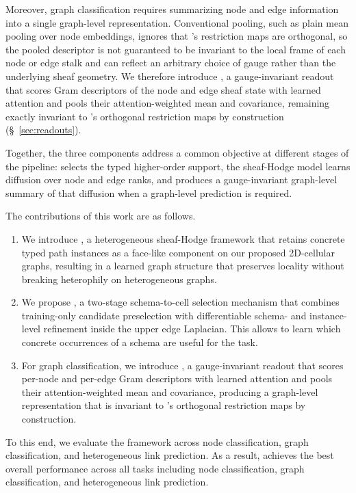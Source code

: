 Moreover, graph classification requires summarizing node and edge information into a single
graph-level representation. Conventional pooling, such as plain mean pooling over node embeddings,
ignores that \method{}'s restriction maps are orthogonal, so the pooled descriptor is not
guaranteed to be invariant to the local frame of each node or edge stalk and can reflect an
arbitrary choice of gauge rather than the underlying sheaf geometry. We therefore introduce
\sheafconvpool{}, a gauge-invariant readout that scores Gram descriptors of the node and edge sheaf
state with learned attention and pools their attention-weighted mean and covariance, remaining
exactly invariant to \method{}'s orthogonal restriction maps by construction (\S~\ref{sec:readouts}).

Together, the three components address a common objective at different stages of the pipeline:
\ampss{} selects the typed higher-order support, the sheaf-Hodge model learns diffusion over node
and edge ranks, and \sheafconvpool{} produces a gauge-invariant graph-level summary of that
diffusion when a graph-level prediction is required.

The contributions of this work are as follows.
\begin{enumerate}
  \item We introduce \method{}, a heterogeneous sheaf-Hodge framework that retains concrete typed
  path instances as a face-like component on our proposed 2D-cellular graphs, resulting in a learned graph structure that preserves locality without breaking heterophily on heterogeneous graphs.
  \item We propose \ampss{}, a two-stage schema-to-cell selection mechanism that combines
  training-only candidate preselection with differentiable schema- and instance-level refinement
  inside the upper edge Laplacian. This allows \method{} to learn which concrete occurrences
  of a schema are useful for the task.
  \item For graph classification, we introduce \sheafconvpool{}, a gauge-invariant readout that
  scores per-node and per-edge Gram descriptors with learned attention and pools their
  attention-weighted mean and covariance, producing a graph-level representation that is
  invariant to \method{}'s orthogonal restriction maps by construction.
\end{enumerate}

To this end, we evaluate the framework across node classification, graph classification, and
heterogeneous link prediction. As a result, \method{} achieves the best overall performance across all tasks including node classification, graph classification, and heterogeneous link prediction.


